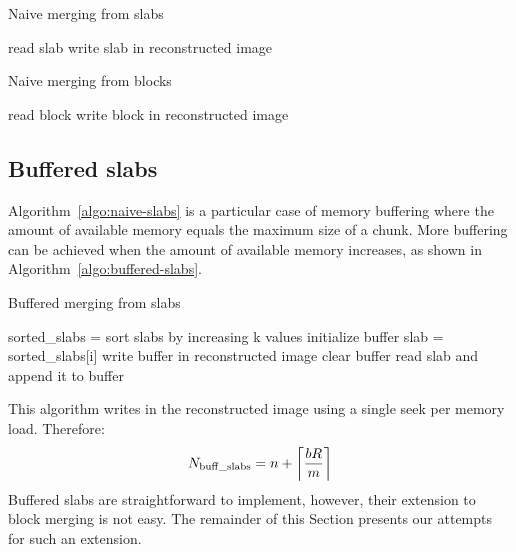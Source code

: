 \documentclass[10pt, conference, compsocconf]{IEEEtran}
\DeclarePairedDelimiter{\ceil}{\lceil}{\rceil}
\begin{document}
\begin{algorithm}
\caption{Naive merging from slabs}
\label{algo:naive-slabs} 
\begin{algorithmic}
    \STATE read slab
    \STATE write slab in reconstructed image
  \ENDFOR      
\end{algorithmic}
\end{algorithm}
\begin{algorithm}[h]
\caption{Naive merging from blocks}
\label{algo:naive-blocks}
\begin{algorithmic}
    \STATE read block
    \STATE write block in reconstructed image
  \ENDFOR 
\end{algorithmic}
\end{algorithm}


\subsection{Buffered slabs}

Algorithm~\ref{algo:naive-slabs} is a particular case of memory
buffering where the amount of available memory equals the maximum size
of a chunk. More buffering can be achieved when the amount of
available memory increases, as shown in
Algorithm~\ref{algo:buffered-slabs}.
\begin{algorithm}[h]
  \caption{Buffered merging from slabs}
  \label{algo:buffered-slabs}
  \begin{algorithmic}[1]
    \STATE sorted\_slabs = sort slabs by increasing k values
    \STATE initialize buffer
      \STATE slab = sorted\_slabs[i]
        \STATE write buffer in reconstructed image
        \STATE clear buffer
      \ENDIF
      \STATE read slab and append it to buffer
    \ENDFOR
  \end{algorithmic}
\end{algorithm}
This algorithm writes in the reconstructed image using a single seek
per memory load. Therefore:
\begin{equation}
N_\mathrm{buff\_slabs} =  n + \ceil*{\frac{bR}{m}} \label{eq:buff-slabs}
\end{equation}
Buffered slabs are straightforward to implement, however, their
extension to block merging is not easy. The remainder of this Section
presents our attempts for such an extension.
\end{document}
